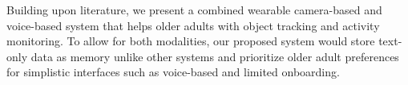 Building upon literature, we present a combined wearable camera-based and voice-based system that helps older adults with object tracking and activity monitoring. To allow for both modalities, our proposed system would store text-only data as memory unlike other systems and prioritize older adult preferences for simplistic interfaces \cite{farivar2020wearable} such as voice-based and limited onboarding. %







